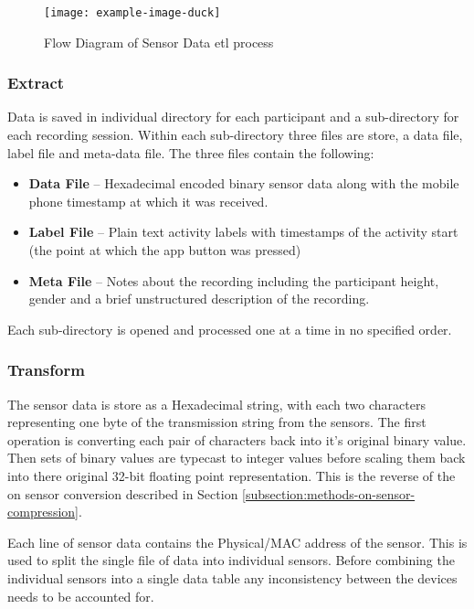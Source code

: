 \begin{figure}[!hbt]
    \centering
    \texttt{[image: example-image-duck]}
    \caption{Flow Diagram of Sensor Data \acrshort{etl} process}
    \label{fig:methods_sensor_ETL}
\end{figure}

\subsubsection{Extract} %
Data is saved in individual directory for each participant and a sub-directory for each recording session. Within each sub-directory three files are store, a data file, label file and meta-data file. The three files contain the following:
\begin{itemize}
    \item \textbf{Data File} -- Hexadecimal encoded binary sensor data along with the mobile phone timestamp at which it was received.
    \item \textbf{Label File} -- Plain text activity labels with timestamps of the activity start (the point at which the app button was pressed)
    \item \textbf{Meta File} -- Notes about the recording including the participant height, gender and a brief unstructured description of the recording.
\end{itemize}

Each sub-directory is opened and processed one at a time in no specified order.

\subsubsection{Transform}
The sensor data is store as a Hexadecimal string, with each two characters representing one byte of the transmission string from the sensors. The first operation is converting each pair of characters back into it's original binary value. Then sets of binary values are typecast to integer values before scaling them back into there original 32-bit floating point representation. This is the reverse of the on sensor conversion described in Section \ref{subsection:methods-on-sensor-compression}.

Each line of sensor data contains the Physical/MAC address of the sensor. This is used to split the single file of data into individual sensors. Before combining the individual sensors into a single data table any inconsistency between the devices needs to be accounted for.

